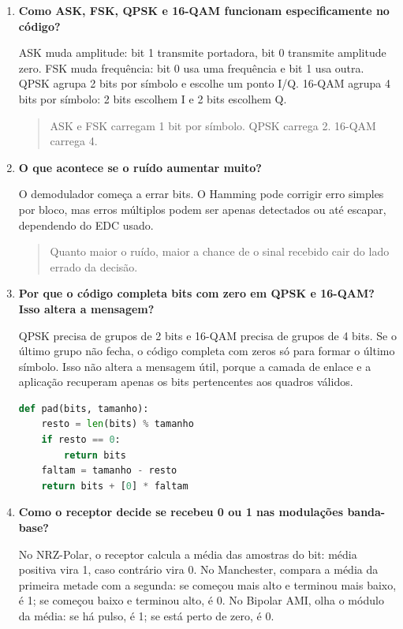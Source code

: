 \documentclass[11pt,a4paper]{article}
\newcommand{\rank}[1]{\textcolor{rankblue}{\textbf{Rank #1}}}
\begin{document}
\begin{enumerate}[leftmargin=1.2cm, itemsep=8pt]
  \item[\rank{15}.] \textbf{Como ASK, FSK, QPSK e 16-QAM funcionam especificamente no código?}

  ASK muda amplitude: bit 1 transmite portadora, bit 0 transmite amplitude zero. FSK muda frequência: bit 0 usa uma frequência e bit 1 usa outra. QPSK agrupa 2 bits por símbolo e escolhe um ponto I/Q. 16-QAM agrupa 4 bits por símbolo: 2 bits escolhem I e 2 bits escolhem Q.

  \begin{quote}
  ASK e FSK carregam 1 bit por símbolo. QPSK carrega 2. 16-QAM carrega 4.
  \end{quote}

  \item[\rank{16}.] \textbf{O que acontece se o ruído aumentar muito?}

  O demodulador começa a errar bits. O Hamming pode corrigir erro simples por bloco, mas erros múltiplos podem ser apenas detectados ou até escapar, dependendo do EDC usado.

  \begin{quote}
  Quanto maior o ruído, maior a chance de o sinal recebido cair do lado errado da decisão.
  \end{quote}

  \item[\rank{17}.] \textbf{Por que o código completa bits com zero em QPSK e 16-QAM? Isso altera a mensagem?}

  QPSK precisa de grupos de 2 bits e 16-QAM precisa de grupos de 4 bits. Se o último grupo não fecha, o código completa com zeros só para formar o último símbolo. Isso não altera a mensagem útil, porque a camada de enlace e a aplicação recuperam apenas os bits pertencentes aos quadros válidos.

  \begin{lstlisting}[language=Python]
def pad(bits, tamanho):
    resto = len(bits) % tamanho
    if resto == 0:
        return bits
    faltam = tamanho - resto
    return bits + [0] * faltam
  \end{lstlisting}

  \item[\rank{18}.] \textbf{Como o receptor decide se recebeu 0 ou 1 nas modulações banda-base?}

  No NRZ-Polar, o receptor calcula a média das amostras do bit: média positiva vira 1, caso contrário vira 0. No Manchester, compara a média da primeira metade com a segunda: se começou mais alto e terminou mais baixo, é 1; se começou baixo e terminou alto, é 0. No Bipolar AMI, olha o módulo da média: se há pulso, é 1; se está perto de zero, é 0.


\end{enumerate}
\end{document}
